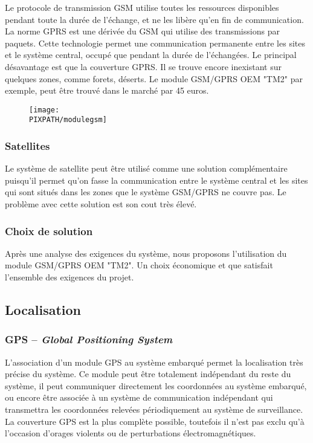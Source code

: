 Le protocole de transmission GSM utilise toutes les ressources disponibles pendant toute la durée de l'échange, et ne les libère qu'en fin de communication.
La norme GPRS est une dérivée du GSM qui utilise des transmissions par paquets. Cette technologie permet une communication permanente entre les sites et le système central, occupé que pendant la durée de l'échangées.
Le principal désavantage est que la couverture GPRS. Il se trouve encore inexistant sur quelques zones, comme forets, déserts.
Le module GSM/GPRS OEM "TM2" par exemple, peut être trouvé dans le marché par 45 euros. 

    \begin{figure}[!h]
    \begin{center}
    \texttt{[image: \\PIXPATH/modulegsm]}
    \caption{}
    \end{center}
    \end{figure}


\subsubsection{Satellites}

Le système de satellite peut être utilisé comme une solution complémentaire puisqu'il permet qu'on fasse la communication entre le système central et les sites qui sont situés dans les zones que le système GSM/GPRS ne couvre pas.
Le problème avec cette solution est son cout  très élevé.

\subsubsection{Choix de solution}
Après une analyse des exigences du système, nous proposons l’utilisation du module GSM/GPRS OEM "TM2". Un choix économique et que satisfait l’ensemble des exigences du projet.

\subsection{Localisation}

\subsubsection{GPS – \textsl{Global Positioning System}}

L’association d’un module GPS au système embarqué permet la localisation très précise du système. Ce module peut être totalement indépendant du reste du système, il peut communiquer directement les coordonnées au système embarqué, ou encore être associée à un système de communication indépendant qui transmettra les coordonnées relevées périodiquement au système de surveillance.
La couverture GPS est la plus complète possible, toutefois il n’est pas exclu qu’à l’occasion d’orages violents ou de perturbations électromagnétiques.


